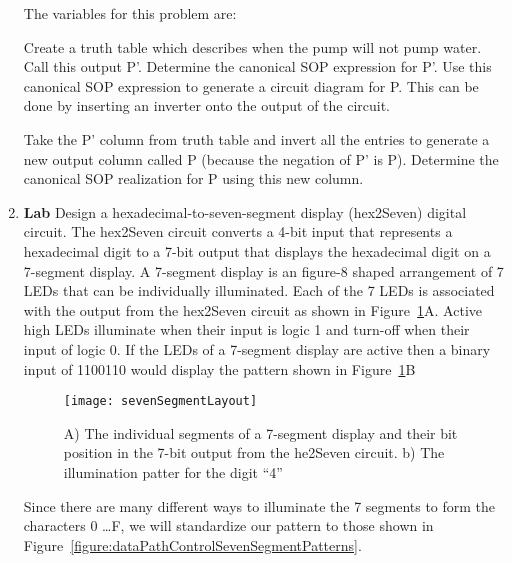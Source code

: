 \begin{enumerate}
The variables for this problem are:
                                                                                
                                                                                
Create a truth table which describes when the pump will not
pump water.  Call this output P'.  Determine the canonical SOP
expression for P'.  Use this canonical SOP expression to generate
a circuit diagram for P.  This can be done by inserting an
inverter onto the output of the circuit.
                                                                                
Take the P' column from truth table and invert all the entries
to generate a new output column called P (because
the negation of P' is P).  Determine the canonical SOP
realization for P using this new column.

\item\textbf{Lab}
Design a hexadecimal-to-seven-segment display (hex2Seven) digital circuit.  The hex2Seven circuit 
converts a 4-bit input that represents a hexadecimal digit to  a 7-bit output that displays the hexadecimal 
digit on a 7-segment display.  A 7-segment display is an figure-8 shaped arrangement of 7 LEDs that can 
be individually illuminated.  Each of the 7 LEDs is associated with the output from the hex2Seven circuit 
as shown in Figure~\ref{figure:dataPathControlSevenSegmentLayout}A.  Active high LEDs illuminate when
their input is logic 1 and turn-off when their input of logic 0.  If the LEDs of a 7-segment display are active
then a binary input of 1100110 would display the pattern shown in  Figure~\ref{figure:dataPathControlSevenSegmentLayout}B 

\begin{figure}[ht]
\texttt{[image: sevenSegmentLayout]}
\caption{A) The individual segments of a 7-segment display and their bit position in the 7-bit output from the he2Seven circuit. 
b) The illumination patter for the digit ``4'' }
\label{figure:dataPathControlSevenSegmentLayout}
\end{figure}

Since there are many different ways to illuminate the 7 segments to form the characters 0 \ldots F, we will standardize our
pattern to those shown in Figure~\ref{figure:dataPathControlSevenSegmentPatterns}.


\end{enumerate}
